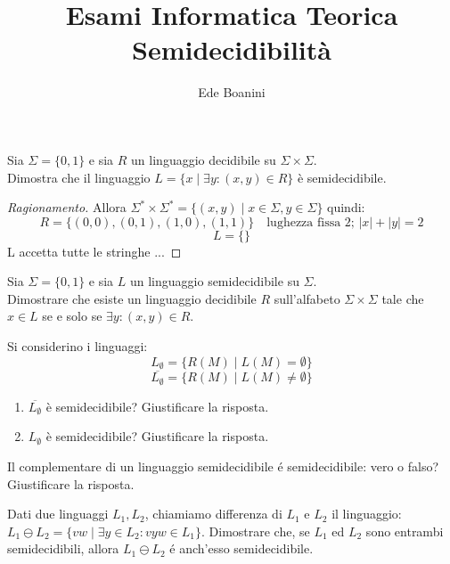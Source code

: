 \documentclass{article}  %
\title{Esami Informatica Teorica \\ Semidecidibilità}
\author{Ede Boanini}
\date{}  %
\newenvironment{ragionamento}[1][]
  {\begin{proof}[Ragionamento#1]\renewcommand{\qedsymbol}{}\normalfont}
  {\end{proof}}
\begin{document}
\maketitle
\begin{esercizio}[Esercizio 1]
Sia $\Sigma=\{0,1\}$ e sia $R$ un linguaggio decidibile su $\Sigma \times \Sigma$. \\ Dimostra che il 
linguaggio $L=\{x \mid \exists y : (x,y) \in R\}$ è semidecidibile. \\
\begin{ragionamento}
Allora $\Sigma^* \times \Sigma^* = \{(x,y) \mid x\in \Sigma, y \in \Sigma\}$ quindi: \\
\[
R = \{(0, 0), (0, 1), (1, 0), (1, 1)\} \quad \text{lughezza fissa 2; } |x|+|y|=2
\]
\[
L = \{\}
\]
L accetta tutte le stringhe ...
\end{ragionamento}
\end{esercizio}

\begin{esercizio}[Esercizio 2]
Sia $\Sigma=\{0,1\}$ e sia $L$ un linguaggio semidecidibile su $\Sigma$. \\ Dimostrare che esiste un linguaggio
decidibile  $R$  sull'alfabeto $\Sigma \times \Sigma$ tale che $x \in L$ se e solo se $\exists y : (x,y) \in R$.\\
\end{esercizio}

\begin{esercizio}[Esercizio 3]
Si considerino i linguaggi:
\[
    L_{\emptyset}=\{R(M) \mid L(M)=\emptyset\}
\]
\[
    \overline{L_{\emptyset}}=\{R(M) \mid L(M) \neq \emptyset\}
\]
\begin{enumerate}
    \item $\overline{L_{\emptyset}}$ è semidecidibile? Giustificare la risposta.
    \item $L_{\emptyset}$ è semidecidibile? Giustificare la risposta.
\end{enumerate}
\end{esercizio}

\begin{esercizio}[Esercizio 4]
Il complementare di un linguaggio semidecidibile é semidecidibile: vero
o falso? Giustificare la risposta.
\end{esercizio}

\begin{esercizio}[Esercizio 5]
Dati due linguaggi $L_1, L_2$, chiamiamo differenza di $L_1$ e $L_2$ il linguaggio: \\
$L_1 \ominus L_2 = \{vw \mid \exists y \in L_2 : vyw \in L_1\} $. Dimostrare che, se $L_1$ ed $L_2$
sono entrambi semidecidibili, allora $L_1 \ominus L_2$ é anch'esso semidecidibile.
\end{esercizio}
\end{document}
